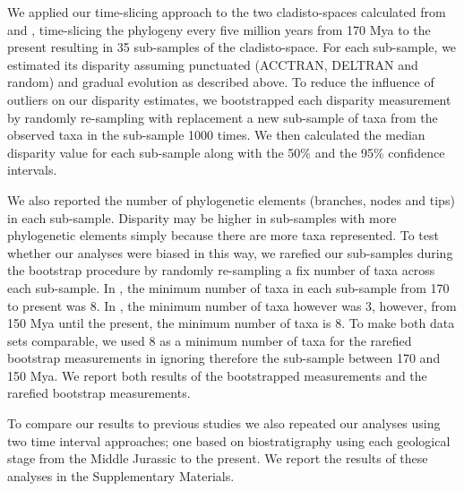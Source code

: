\documentclass[12pt,letterpaper]{article}
\begin{document}
We applied our time-slicing approach to the two cladisto-spaces calculated from \cite{Slater2012MEE} and \cite{beckancient2014}, time-slicing the phylogeny every five million years from 170 Mya to the present resulting in 35 sub-samples of the cladisto-space. %
For each sub-sample, we estimated its disparity assuming punctuated (ACCTRAN, DELTRAN and random) and gradual evolution as described above.
To reduce the influence of outliers on our disparity estimates, we bootstrapped each disparity measurement by randomly re-sampling with replacement a new sub-sample of taxa from the observed taxa in the sub-sample 1000 times.
We then calculated the median disparity value for each sub-sample along with the 50\% and the 95\% confidence intervals.

We also reported the number of phylogenetic elements (branches, nodes and tips) in each sub-sample.
Disparity may be higher in sub-samples with more phylogenetic elements simply because there are more taxa represented.
To test whether our analyses were biased in this way, we rarefied our sub-samples during the bootstrap procedure by randomly re-sampling a fix number of taxa across each sub-sample.
In \cite{Slater2012MEE}, the minimum number of taxa in each sub-sample from 170 to present was 8.
In \cite{beckancient2014}, the minimum number of taxa however was 3, however, from 150 Mya until the present, the minimum number of taxa is 8.
To make both data sets comparable, we used 8 as a minimum number of taxa for the rarefied bootstrap measurements in \cite{beckancient2014} ignoring therefore the sub-sample between 170 and 150 Mya.
We report both results of the bootstrapped measurements and the rarefied bootstrap measurements.

To compare our results to previous studies we also repeated our analyses using two time interval approaches; one based on biostratigraphy \citep[e.g.][]{cisneros2010,prentice2011,Hughes20082013,bentonmodels2014} using each geological stage from the Middle Jurassic to the present.
We report the results of these analyses in the Supplementary Materials. %
\end{document}
